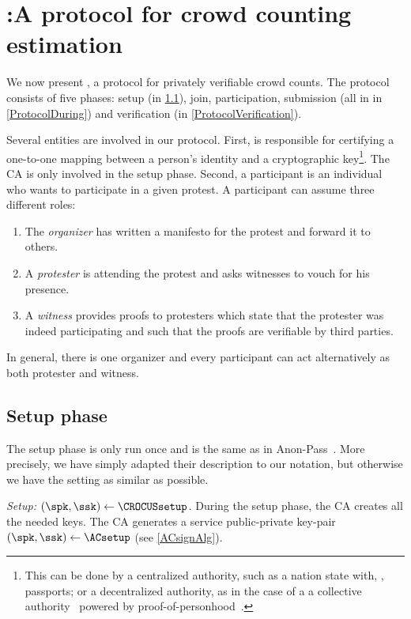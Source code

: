 \section{\CROCUS:\@ A protocol for crowd counting estimation}%
\label{Protocol}


We now present \CROCUS, a protocol for privately verifiable crowd counts.
The protocol consists of five phases: setup (in \cref{ProtocolSetup}),
join, participation, submission (all in in \cref{ProtocolDuring}) and
verification (in \cref{ProtocolVerification}).

Several entities are involved in our protocol.
First,  is responsible for certifying a one-to-one mapping between a 
person's identity and a cryptographic key\footnote{%
  This can be done by a centralized authority, such as a nation state with, 
  \eg, passports; or a decentralized authority, as in the case of a a 
  collective authority~\cite{collective-signing} powered by 
  proof-of-personhood~\cite{proof-of-personhood}.
}.
The \ac{CA} is only involved in the setup phase.
Second, a participant is an individual who wants to participate in a given 
protest.
A participant can assume three different roles:
\begin{enumerate}
\item The \emph{organizer} has written a manifesto for the protest and forward it to others.
\item A \emph{protester} is attending the protest and asks witnesses to vouch 
  for his presence.
\item A \emph{witness} provides proofs to protesters which state that the 
  protester was indeed participating and such that the proofs are verifiable by 
  third parties.
\end{enumerate}
In general, there is one organizer and every participant can act alternatively 
as both protester and witness.

\subsection{Setup phase}%
\label{ProtocolSetup}

The setup phase is only run once and is the same as in Anon-Pass~\cite{AnonPass}.
More precisely, we have simply adapted their description to our notation, but otherwise we have the setting as similar as possible.


\emph{Setup: \((\spk, \ssk)\gets \CROCUSsetup\).}
During the setup phase, the \ac{CA} creates all the needed keys.
The \ac{CA} generates a service public-private key-pair \((\spk, \ssk)\gets 
  \ACsetup\) (see \cref{ACsignAlg}).

